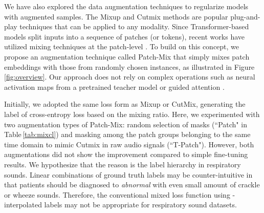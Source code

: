 \documentclass{INTERSPEECH2023}
\begin{document}
We have also explored the data augmentation techniques to regularize models with augmented samples.
The Mixup \cite{zhang2017mixup} and Cutmix \cite{yun2019cutmix} methods are popular plug-and-play techniques that can be applied to any modality. Since Transformer-based models split inputs into a sequence of patches (or tokens), recent works have utilized mixing techniques at the patch-level \cite{liu2022tokenmix, choi2022tokenmixup}. To build on this concept, we propose an augmentation technique called Patch-Mix that simply mixes patch embeddings with those from randomly chosen instances, as illustrated in Figure\,\ref{fig:overview}. Our approach does not rely on complex operations such as neural activation maps from a pretrained teacher model \cite{liu2022tokenmix} or guided attention \cite{choi2022tokenmixup}.

Initially, we adopted the same loss form as Mixup or CutMix, generating the label of cross-entropy loss based on the mixing ratio.
Here, we experimented with two augmentation types of Patch-Mix: random selection of masks (``Patch" in Table\,\ref{tab:mixcl}) and masking among the patch groups belonging to the same time domain to mimic Cutmix in raw audio signals (``T-Patch"). 
However, both augmentations did not show the improvement compared to simple fine-tuning results. We hypothesize that the reason is the label hierarchy in respiratory sounds. Linear combinations of ground truth labels may be counter-intuitive in that patients should be diagnosed to \textit{abnormal} with even small amount of crackle or wheeze sounds. Therefore, the conventional mixed loss function using -interpolated labels may not be appropriate for respiratory sound datasets.
\vspace{-3pt}
\end{document}
